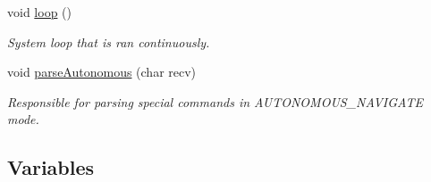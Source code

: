 \begin{DoxyCompactItemize}
void \hyperlink{robotcode_8ino_afe461d27b9c48d5921c00d521181f12f}{loop} ()
\begin{DoxyCompactList}\small\item\em System loop that is ran continuously. \end{DoxyCompactList}\item 
void \hyperlink{robotcode_8ino_a98da970f4d5707cef3faf45d97b2a0a9}{parse\+Autonomous} (char recv)
\begin{DoxyCompactList}\small\item\em Responsible for parsing special commands in A\+U\+T\+O\+N\+O\+M\+O\+U\+S\+\_\+\+N\+A\+V\+I\+G\+A\+T\+E mode. \end{DoxyCompactList}\end{DoxyCompactItemize}
\subsection*{Variables}
